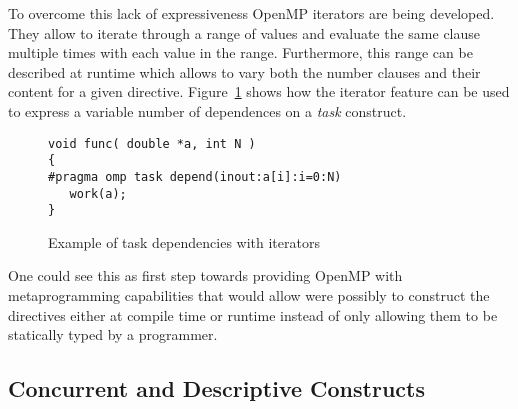 To overcome this lack of expressiveness OpenMP iterators are being developed.
They allow to iterate through a range of values and evaluate the same clause
multiple times with each value in the range. Furthermore, this range can be
described at runtime which allows to vary both the number clauses and their
content for a given directive. Figure~\ref{fig:iterators} shows how the iterator
feature can be used to express a variable number of dependences on a \emph{task}
construct.

\begin{figure}
\begin{verbatim}
void func( double *a, int N )
{
#pragma omp task depend(inout:a[i]:i=0:N)
   work(a);
}
\end{verbatim}
\caption{Example of task dependencies with iterators}
\label{fig:iterators}
\end{figure}
   
One could see this as first step towards providing OpenMP with metaprogramming
capabilities that would allow were possibly to construct the directives either
at compile time or runtime instead of only allowing them to be statically typed
by a programmer.

\subsection{Concurrent and Descriptive Constructs}
\label{sub:concurrent_and_descriptive_constructs}


   

